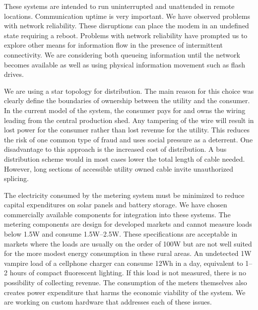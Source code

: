 \documentclass[conference]{IEEEtran}
\begin{document}
These systems are intended to run uninterrupted and unattended in 
remote locations.  Communication uptime is very important.  We have 
observed problems with network reliability.  These disruptions can
place the modem in an undefined state requiring a reboot.  
Problems with network reliability have prompted us to explore other 
means for information flow in the presence of intermittent connectivity.
We are considering both queueing information until the network becomes
available as well as using physical information movement such as flash
drives.

We are using a star topology for distribution.  The main reason for this
choice was clearly define the boundaries of ownership between the utility
and the consumer.  In the current model of the system, the consumer pays for
and owns the wiring leading from the central production shed.  Any tampering
of the wire will result in lost power for the consumer rather than lost 
revenue for the utility.  This reduces the risk of one common type of fraud
and uses social pressure as a deterrent.
One disadvantage to this approach is the increased cost of distribution.
A bus distribution scheme would in most cases lower the total length of 
cable needed.  However, long sections of accessible utility owned cable 
invite unauthorized splicing.


The electricity consumed by the metering system must be minimized to 
reduce capital expenditures on solar panels and battery storage.  We 
have chosen commercially available components for integration into
these systems.  The metering components are design for developed markets
and cannot measure loads below 1.5W and consume 1.5W--2.5W.  These 
specifications are acceptable in markets where the loads are usually
on the order of 100W but are not well suited for the more modest 
energy consumption in these rural areas.  An undetected 1W vampire load of a
cellphone charger can consume 12Wh in a day, equivalent to 1--2 hours
of compact fluorescent lighting.  If this load is not measured, there 
is no possibility of collecting revenue.  The consumption of the meters
themselves also creates power expenditure that harms the economic viability
of the system.  We are working on custom hardware that addresses each 
of these issues.
\end{document}
